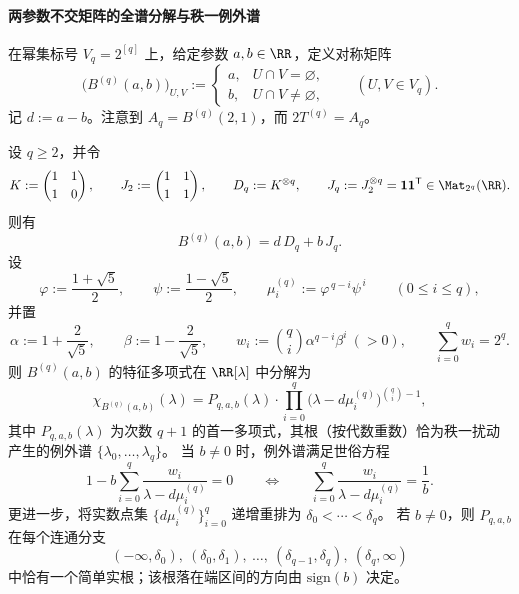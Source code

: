 \paragraph{两参数不交矩阵的全谱分解与秩一例外谱}
在幂集标号 \(V_q=2^{[q]}\) 上，给定参数 \(a,b\in\RR\)，定义对称矩阵
\begin{equation}\label{eq:xi-two-param-disjointness-definition}
\bigl(B^{(q)}(a,b)\bigr)_{U,V}:=
\begin{cases}
a,&U\cap V=\varnothing,\\
b,&U\cap V\neq\varnothing,
\end{cases}
\qquad(U,V\in V_q).
\end{equation}
记 \(d:=a-b\)。注意到 \(A_q=B^{(q)}(2,1)\)，而 \(2T^{(q)}=A_q\)。

\begin{theorem}\label{thm:xi-two-param-disjointness-full-spectrum-secular}
设 \(q\ge 2\)，并令
\[
K:=\begin{pmatrix}1&1\\[2pt]1&0\end{pmatrix},\qquad
J_2:=\begin{pmatrix}1&1\\[2pt]1&1\end{pmatrix},\qquad
D_q:=K^{\otimes q},\qquad
J_q:=J_2^{\otimes q}=\mathbf 1\mathbf 1^{\mathsf T}\in\Mat_{2^q}(\RR).
\]
则有
\begin{equation}\label{eq:xi-two-param-disjointness-kronecker-form}
B^{(q)}(a,b)=d\,D_q+b\,J_q.
\end{equation}
设
\[
\varphi:=\frac{1+\sqrt5}{2},\qquad \psi:=\frac{1-\sqrt5}{2},\qquad
\mu_i^{(q)}:=\varphi^{\,q-i}\psi^{\,i}\qquad(0\le i\le q),
\]
并置
\[
\alpha:=1+\frac{2}{\sqrt5},\qquad \beta:=1-\frac{2}{\sqrt5},\qquad
w_i:=\binom{q}{i}\alpha^{q-i}\beta^{i}\ (>0),\qquad \sum_{i=0}^q w_i=2^q.
\]
则 \(B^{(q)}(a,b)\) 的特征多项式在 \(\RR[\lambda]\) 中分解为
\begin{equation}\label{eq:xi-two-param-disjointness-charpoly-factorization}
\chi_{B^{(q)}(a,b)}(\lambda)=
P_{q,a,b}(\lambda)\cdot \prod_{i=0}^{q}\bigl(\lambda-d\mu_i^{(q)}\bigr)^{\binom{q}{i}-1},
\end{equation}
其中 \(P_{q,a,b}(\lambda)\) 为次数 \(q+1\) 的首一多项式，其根（按代数重数）恰为秩一扰动产生的例外谱 \(\{\lambda_0,\dots,\lambda_q\}\)。
当 \(b\neq 0\) 时，例外谱满足世俗方程
\begin{equation}\label{eq:xi-two-param-disjointness-secular}
1-b\sum_{i=0}^q \frac{w_i}{\lambda-d\mu_i^{(q)}}=0
\qquad\Longleftrightarrow\qquad
\sum_{i=0}^q \frac{w_i}{\lambda-d\mu_i^{(q)}}=\frac1b.
\end{equation}
更进一步，将实数点集 \(\{d\mu_i^{(q)}\}_{i=0}^q\) 递增重排为 \(\delta_0<\cdots<\delta_q\)。
若 \(b\neq 0\)，则 \(P_{q,a,b}\) 在每个连通分支
\[
(-\infty,\delta_0),\ (\delta_0,\delta_1),\ \dots,\ (\delta_{q-1},\delta_q),\ (\delta_q,\infty)
\]
中恰有一个简单实根；该根落在端区间的方向由 \(\mathrm{sign}(b)\) 决定。
\end{theorem}

